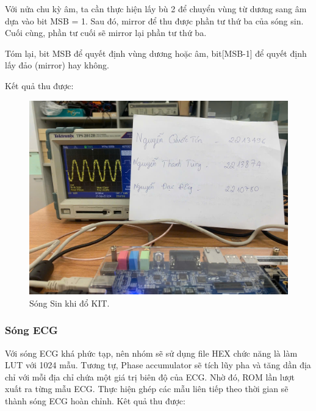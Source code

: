 Với nửa chu kỳ âm, ta cần thực hiện lấy bù 2 để chuyển vùng từ dương sang âm dựa vào bit MSB = 1. Sau đó, mirror để thu được phần tư thứ ba của sóng sin. Cuối cùng, phần tư cuối sẽ mirror lại phần tư thứ ba.

Tóm lại, bit MSB để quyết định vùng dương hoặc âm, bit[MSB-1] để quyết định lấy đảo (mirror) hay không.

Kết quả thu được:

\begin{figure}[H]
	\centering
	\includegraphics[width=\linewidth]{./my-chapters/my-images/Gen_wave/hinh2.jpg}
	\caption{Sóng Sin khi đổ KIT.}
	\label{f: sin wave}
\end{figure}

\subsubsection{Sóng ECG}

Với sóng ECG khá phức tạp, nên nhóm sẽ sử dụng file HEX chức năng là làm LUT với 1024 mẫu. Tương tự, Phase accumulator sẽ tích lũy pha và tăng dần địa chỉ với mỗi địa chỉ chứa một giá trị biên độ của ECG. Nhờ đó, ROM lần lượt xuất ra từng mẫu ECG. Thực hiện ghép các mẫu liên tiếp theo thời gian sẽ thành sóng ECG hoàn chỉnh. Kêt quả thu được:


